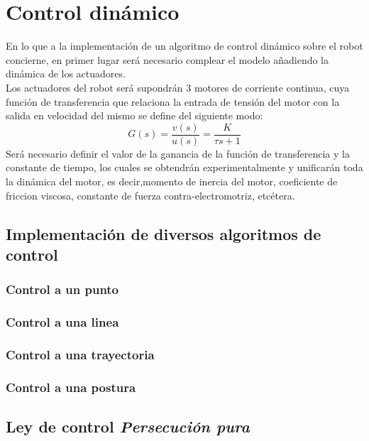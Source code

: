 \documentclass[a4paper,twoside]{article}
\begin{document}
\newpage
\section{Control dinámico}
En lo que a la implementación de un algoritmo de control dinámico sobre el robot concierne, en primer lugar será necesario complear el modelo añadiendo la dinámica de los actuadores.\\
Los actuadores del robot será supondrán 3 motores de corriente continua, cuya función de transferencia que relaciona la entrada de tensión del motor con la salida en velocidad del mismo se define del siguiente modo:
\begin{equation}
	G(s)=\frac{v(s)}{u(s)}=\frac{K}{\tau s+1}
\end{equation}
Será necesario definir el valor de la ganancia de la función de transferencia y la constante de tiempo, los cuales se obtendrán experimentalmente y unificarán toda la dinámica del motor, es decir,momento de inercia del motor, coeficiente de friccion viscosa, constante de fuerza contra-electromotriz, etcétera.
\subsection{Implementación de diversos algoritmos de control}
	\subsubsection{Control a un punto}
	\subsubsection{Control a una linea}
	\subsubsection{Control a una trayectoria}
	\subsubsection{Control a una postura}
\subsection{Ley de control \textit{Persecución pura}}

%
%
\end{document}
